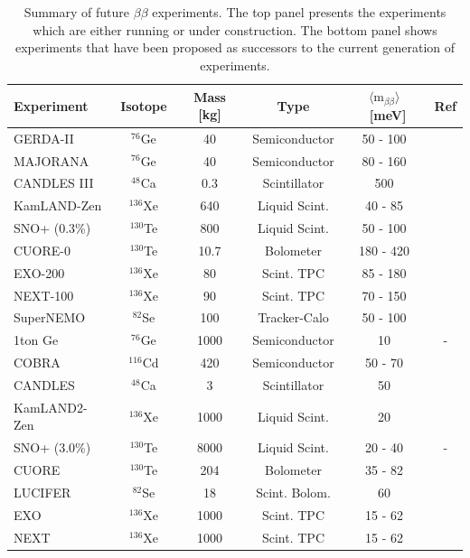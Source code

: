 \documentclass[main.tex]{subfiles}
\begin{document}
\begin{table}
\centering
\begin{tabular}{lccccc}
\toprule
Experiment & Isotope & Mass [kg] & Type & $ \langle \text{m}_{\beta\beta} \rangle$~[meV] & Ref \\ 
\midrule
GERDA-II     & $^{\text{76}}$Ge  & 40   & Semiconductor & 50 - 100  & \cite{GERDA}        \\
MAJORANA     & $^{\text{76}}$Ge  & 40   & Semiconductor & 80 - 160  & \cite{MAJORANA}     \\
CANDLES III  & $^{\text{48}}$Ca  & 0.3  & Scintillator  & 500       & \cite{CANDLESIII}   \\
KamLAND-Zen  & $^{\text{136}}$Xe & 640  & Liquid Scint. & 40 - 85   & \cite{KamLAND-Zen3} \\
SNO+ (0.3\%) & $^{\text{130}}$Te & 800  & Liquid Scint. & 50 - 100  &  \\
CUORE-0      & $^{\text{130}}$Te & 10.7 & Bolometer     & 180 - 420 & \cite{CUORE}        \\
EXO-200      & $^{\text{136}}$Xe & 80   & Scint. TPC    & 85 - 180  & \cite{EXO-200}      \\
NEXT-100     & $^{\text{136}}$Xe & 90   & Scint. TPC    & 70 - 150  & \cite{NEXT}         \\
SuperNEMO    & $^{\text{82}}$Se  & 100  & Tracker-Calo  & 50 - 100  &  \\
\midrule
1ton Ge      & $^{\text{76}}$Ge  & 1000 & Semiconductor & 10        & - \\
COBRA        & $^{\text{116}}$Cd & 420  & Semiconductor & 50 - 70   & \cite{COBRA}        \\
CANDLES      & $^{\text{48}}$Ca  & 3    & Scintillator  & 50        & \cite{CANDLESIII}   \\
KamLAND2-Zen & $^{\text{136}}$Xe & 1000 & Liquid Scint. & 20        & \cite{KamLAND-Zen3} \\
SNO+ (3.0\%) & $^{\text{130}}$Te & 8000 & Liquid Scint. & 20 - 40   & - \\
CUORE        & $^{\text{130}}$Te & 204  & Bolometer     & 35 - 82   & \cite{CUORE}        \\
LUCIFER      & $^{\text{82}}$Se  & 18   & Scint. Bolom. & 60        & \cite{LUCIFER}      \\
EXO          & $^{\text{136}}$Xe & 1000 & Scint. TPC    & 15 - 62   & \cite{EXO-200}      \\
NEXT         & $^{\text{136}}$Xe & 1000 & Scint. TPC    & 15 - 62   & \cite{NEXT}         \\
\bottomrule
\end{tabular}
\caption{Summary of future $\beta\beta$ experiments. The top panel presents the experiments
which are either running or under construction. The bottom panel shows
experiments that have been proposed as successors to the current generation
of experiments.}
\label{tab:futureBBexperiment}
\end{table}
\end{document}
